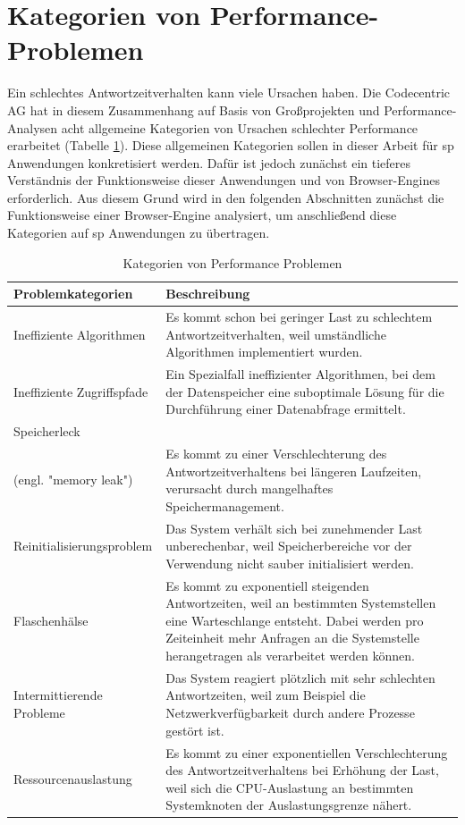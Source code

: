 \section{Kategorien von Performance-Problemen}
\label{performance-kategorien}
Ein schlechtes Antwortzeitverhalten kann viele Ursachen haben. Die Codecentric AG hat in diesem Zusammenhang auf Basis von Großprojekten und Performance-Analysen acht allgemeine Kategorien von Ursachen schlechter Performance erarbeitet (Tabelle \ref{table-cc-performance})\cite{cc-performance}. Diese allgemeinen Kategorien sollen in dieser Arbeit für \gls{sp} Anwendungen konkretisiert werden. Dafür ist jedoch zunächst ein tieferes Verständnis der Funktionsweise dieser Anwendungen und von Browser-Engines erforderlich. Aus diesem Grund wird in den folgenden Abschnitten zunächst die Funktionsweise einer Browser-Engine analysiert, um anschließend diese Kategorien auf \gls{sp} Anwendungen zu übertragen. 
\begin{table}
	\centering
	\begin{tabular}{lp{8cm}}
	\textbf{Problemkategorien} & \textbf{Beschreibung}\\
	\hline
	Ineffiziente Algorithmen & Es kommt schon bei geringer Last zu schlechtem Antwortzeitverhalten, weil umständliche Algorithmen implementiert wurden.\\
	Ineffiziente Zugriffspfade & Ein Spezialfall ineffizienter Algorithmen, bei dem der Datenspeicher eine suboptimale Lösung für die Durchführung einer Datenabfrage ermittelt.\\
	Speicherleck\\(engl. "memory leak") & Es kommt zu einer Verschlechterung des Antwortzeitverhaltens bei längeren Laufzeiten, verursacht durch mangelhaftes Speichermanagement.\\
	Reinitialisierungsproblem & Das System verhält sich bei zunehmender Last unberechenbar, weil Speicherbereiche vor der Verwendung nicht sauber initialisiert werden.\\
	Flaschenhälse & Es kommt zu exponentiell steigenden Antwortzeiten, weil an bestimmten Systemstellen eine Warteschlange entsteht. Dabei werden pro Zeiteinheit mehr Anfragen an die Systemstelle herangetragen als verarbeitet werden können.\\
	Intermittierende Probleme & Das System reagiert plötzlich mit sehr schlechten Antwortzeiten, weil zum Beispiel die Netzwerkverfügbarkeit durch andere Prozesse gestört ist.\\
	Ressourcenauslastung & Es kommt zu einer exponentiellen Verschlechterung des Antwortzeitverhaltens bei Erhöhung der Last, weil sich die CPU-Auslastung an bestimmten Systemknoten der Auslastungsgrenze nähert.\\
	\end{tabular}
	\caption{Kategorien von Performance Problemen \cite{cc-performance}}
	\label{table-cc-performance}
\end{table}

